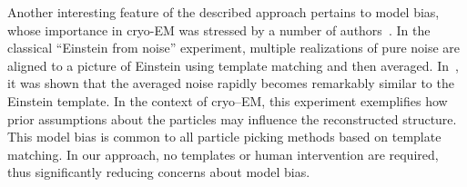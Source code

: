 \documentclass[9pt,twocolumn,twoside,lineno]{pnas-new}
\begin{document}
Another interesting feature of the described approach pertains to model bias, whose importance in cryo-EM was stressed by a number of authors~\cite{shatsky2009method,vanheel1992correlation,henderson2013avoiding,vanheel2013finding}. In the classical ``Einstein from noise'' experiment, multiple realizations of pure noise are aligned to a picture of Einstein using template matching and then averaged. In~\cite{shatsky2009method}, it was shown that the averaged noise rapidly becomes remarkably similar to the Einstein template. In the context of cryo--EM, this experiment exemplifies how prior assumptions about the particles may influence the reconstructed structure. This model bias is common to all particle picking methods based on template matching. In our approach, no templates or human intervention are required, thus significantly reducing concerns about model bias. %

%
\end{document}
